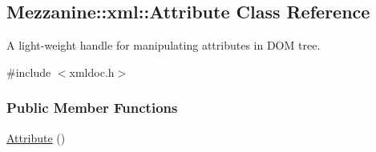 \hypertarget{classMezzanine_1_1xml_1_1Attribute}{
\subsection{Mezzanine::xml::Attribute Class Reference}
\label{classMezzanine_1_1xml_1_1Attribute}
}


A light-\/weight handle for manipulating attributes in DOM tree.  




{\ttfamily \#include $<$xmldoc.h$>$}

\subsubsection*{Public Member Functions}
\begin{DoxyCompactItemize}
\item 
\hypertarget{classMezzanine_1_1xml_1_1Attribute_a736cd7864163361a2cc76cd8cc85d50f}{
\hyperlink{classMezzanine_1_1xml_1_1Attribute_a736cd7864163361a2cc76cd8cc85d50f}{Attribute} ()}
\label{classMezzanine_1_1xml_1_1Attribute_a736cd7864163361a2cc76cd8cc85d50f}


\end{DoxyCompactItemize}
